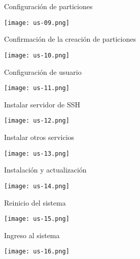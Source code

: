 \begin{frame}[c]{Configuración de particiones}
  \begin{center}
    \texttt{[image: us-09.png]}
  \end{center}
\end{frame}

\begin{frame}[c]{Confirmación de la creación de particiones}
  \begin{center}
    \texttt{[image: us-10.png]}
  \end{center}
\end{frame}

\begin{frame}[c]{Configuración de usuario}
  \begin{center}
    \texttt{[image: us-11.png]}
  \end{center}
\end{frame}

\begin{frame}[c]{Instalar servidor de SSH}
  \begin{center}
    \texttt{[image: us-12.png]}
  \end{center}
\end{frame}

\begin{frame}[c]{Instalar otros servicios}
  \begin{center}
    \texttt{[image: us-13.png]}
  \end{center}
\end{frame}

\begin{frame}[c]{Instalación y actualización}
  \begin{center}
    \texttt{[image: us-14.png]}
  \end{center}
\end{frame}

\begin{frame}[c]{Reinicio del sistema}
  \begin{center}
    \texttt{[image: us-15.png]}
  \end{center}
\end{frame}

\begin{frame}[c]{Ingreso al sistema}
  \begin{center}
    \texttt{[image: us-16.png]}
  \end{center}
\end{frame}

